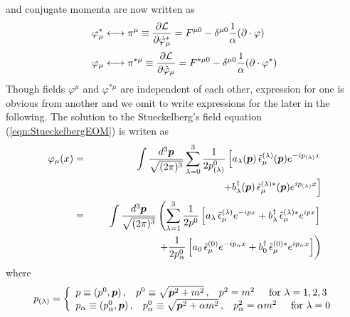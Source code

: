 and conjugate momenta are now written as
\begin{eqnarray}
\begin{array}{l}
\displaystyle
\varphi^*_\mu
\longleftrightarrow
\pi^\mu 
 \equiv \frac{
\partial {\cal L} }
{\partial \dot{\varphi}_\mu^*}
= F^{\mu 0}
- \delta^{\mu 0}\frac{1}{\alpha}
(\partial \cdot \varphi)
\vspace{2mm}
\\
\displaystyle
\varphi_\mu
\longleftrightarrow
\pi^{* \mu} 
\equiv \frac{
\partial {\cal L} }
{\partial \dot{\varphi}_\mu}
= F^{*\mu 0}
- \delta^{\mu 0}\frac{1}{\alpha}
(\partial \cdot \varphi^*)
\end{array}
\label{eqn:StueckelConjMom}
\end{eqnarray}
Though fields $\varphi^\mu$ and $\varphi^{*\mu}$ are independent of each other,
expression for one is obvious from another and we omit to write expressions for the later 
in the following.
The solution to the Stueckelberg's field equation (\ref{eqn:StueckelbergEOM})
is writen as
\begin{eqnarray}
\varphi_\mu(x)
&=&
\int
\frac{d^3 \bld{p}}{\sqrt{(2\pi)^3}}
\sum_{\lambda=0}^3
\frac{1}{2p^0_{(\lambda)}}
\left[
a_\lambda (\bld{p})
\,
\tilde{\epsilon}_\mu^{(\lambda)} (\bld{p})
e^{-i p_{(\lambda)} x}
\right.
\nonumber\\
&&
\left.
\hspace{30mm}
+
b_\lambda^\dagger (\bld{p})
\,
\tilde{\epsilon}_\mu^{(\lambda)*} (\bld{p})
e^{i p_{(\lambda)} x}
\right]
\nonumber\\
&=&
\int
\frac{d^3 \bld{p}}{\sqrt{(2\pi)^3}}
\left(
\sum_{\lambda=1}^3
\frac{1}{2p^0}
\left[
a_\lambda 
\,
\tilde{\epsilon}_\mu^{(\lambda)} 
e^{-i p x}
+
b_\lambda^\dagger 
\,
\tilde{\epsilon}_\mu^{(\lambda)*} 
e^{i p x}
\right]
\right.
\nonumber\\
&&
\left.
\hspace{23mm}
+
\frac{1}{2p_\alpha^0}
\left[
a_0
\,
\tilde{\epsilon}_\mu^{(0)} 
e^{-i p_\alpha x}
+
b_0^\dagger 
\,
\tilde{\epsilon}_\mu^{(0)*} 
e^{i p_\alpha x}
\right]
\right)
\nonumber\\
\label{eqn:MassVStueckSol}
\end{eqnarray}
where
\begin{eqnarray}
p_{(\lambda)}
=
\left\{
\begin{array}{l}
p
\equiv
(p^0, \mbox{\boldmath $p$})
\,,
\hspace{3mm}
p^0
\equiv
\sqrt{\mbox{\boldmath $p$}^2 + m^2}
\,,
\hspace{3mm}
p^2 = m^2
\hspace{5mm}
\mbox{for }
\lambda = 1, 2, 3
\\
p_\alpha
\equiv
(p^0_\alpha, \mbox{\boldmath $p$})
\,,
\hspace{3mm}
p^0_\alpha
\equiv
\sqrt{\mbox{\boldmath $p$}^2 + \alpha m^2}
\,,
\hspace{3mm}
p^2_\alpha = \alpha m^2
\hspace{5mm}
\mbox{for }
\lambda = 0
\end{array}
\right.
\label{eqn:StuckelExpressMomenta}
\end{eqnarray}
